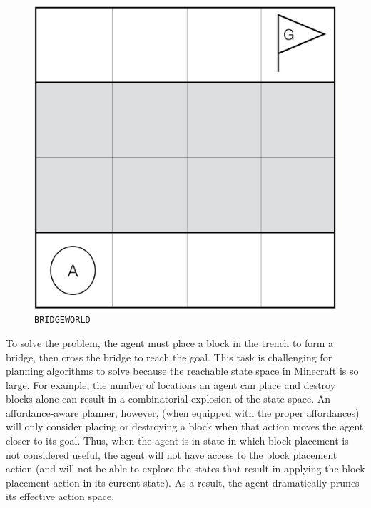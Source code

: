 \documentclass[]{article}
\begin{document}
\begin{figure}
\centering
\includegraphics[scale=0.17]{figures/bridgeworld.jpg}
\caption{\texttt{BRIDGEWORLD}
\label{fig:bridgeworld}}
\end{figure}

To solve the problem, the agent must place a block in the trench to
form a bridge, then cross the bridge to reach the goal.  This task is
challenging for planning algorithms to solve because the reachable
state space in Minecraft is so large. For example, the number of
locations an agent can place and destroy blocks alone can result in a
combinatorial explosion of the state space. An affordance-aware
planner, however, (when equipped with the proper affordances) will
only consider placing or destroying a block when that action moves
the agent closer to its goal. Thus, when the agent is in state in
which block placement is not considered useful, the agent will not
have access to the block placement action (and will not be able to
explore the states that result in applying the block placement action
in its current state). As a result, the agent dramatically prunes its
effective action space.


\end{document}

